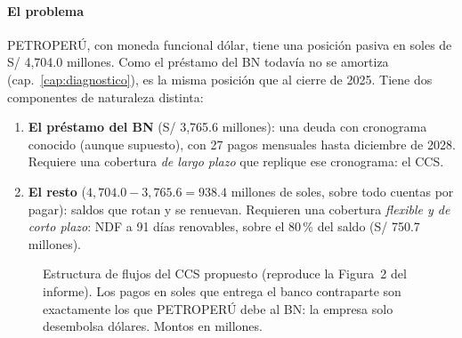 \paragraph{El problema} PETROPERÚ, con moneda funcional dólar, tiene una posición pasiva en soles de S/ 4,704.0 millones. Como el préstamo del BN todavía no se amortiza (cap.~\ref{cap:diagnostico}), es la misma posición que al cierre de 2025. Tiene dos componentes de naturaleza distinta:
\begin{enumerate}
\item \textbf{El préstamo del BN} (S/ 3,765.6 millones): una deuda con cronograma conocido (aunque supuesto), con 27 pagos mensuales hasta diciembre de 2028. Requiere una cobertura \emph{de largo plazo} que replique ese cronograma: el CCS.
\item \textbf{El resto} ($4{,}704.0-3{,}765.6=938.4$ millones de soles, sobre todo cuentas por pagar): saldos que rotan y se renuevan. Requieren una cobertura \emph{flexible y de corto plazo}: NDF a 91 días renovables, sobre el 80\,\% del saldo (S/ 750.7 millones).
\end{enumerate}

\begin{figure}[H]
\centering\small
{}
\caption{Estructura de flujos del CCS propuesto (reproduce la Figura~2 del informe). Los pagos en soles que entrega el banco contraparte son exactamente los que PETROPERÚ debe al BN: la empresa solo desembolsa dólares. Montos en millones.}\label{fig:ccs_flujos}
\end{figure}

